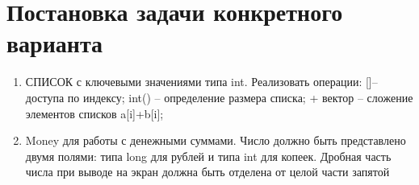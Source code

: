     \section{Постановка задачи конкретного варианта}
    \begin{enumerate}
     \item СПИСОК с ключевыми значениями типа int. Реализовать операции: []– доступа по индексу; int() – определение размера списка; + вектор – сложение элементов списков a[i]+b[i];
     \item Money для работы с денежными суммами. Число должно быть представлено двумя полями: типа long для рублей и типа int для копеек. Дробная часть числа при выводе на экран должна быть отделена от целой части запятой
    \end{enumerate}

